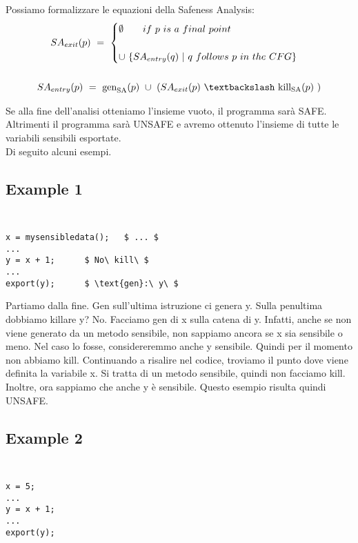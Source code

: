 \documentclass[letterpaper,twocolumn,10pt]{article}
\begin{document}
Possiamo formalizzare le equazioni della Safeness Analysis:
\begin{gather*}
SA_\textrm{$exit$}(p)\ =\ 
\begin{cases}
\emptyset\qquad if\ p\ is\ a\ final\ point\ \\ \\
\cup\ \lbrace SA_\textrm{$entry$}(q)\ |\ q\ follows\ p\ in\ the\ CFG \rbrace 
\end{cases} \\ \\
SA_\textrm{$entry$}(p)\ =\ \text{gen}_\textrm{SA}(p)\ \cup\ (SA_\textrm{$exit$}(p)\ \textbackslash\ \text{kill}_\textrm{SA}(p)\ )
\end{gather*}

Se alla fine dell'analisi otteniamo l'insieme vuoto, il programma sar\`a SAFE. Altrimenti il programma sar\`a UNSAFE e avremo ottenuto l'insieme di tutte le variabili sensibili esportate.\\
Di seguito alcuni esempi.\\

\subsection{Example 1}
{\tt \small
\begin{verbatim}
x = mysensibledata();	$ ... $		
...
y = x + 1;		$ No\ kill\ $
...	
export(y);		$ \text{gen}:\ y\ $
\end{verbatim}
}

Partiamo dalla fine. Gen sull'ultima istruzione ci genera y. Sulla penultima dobbiamo killare y? No. Facciamo gen di x sulla catena di y. Infatti, anche se non viene generato da un metodo sensibile, non sappiamo ancora se x sia sensibile o meno. Nel caso lo fosse, considereremmo anche y sensibile. Quindi per il momento non abbiamo kill. Continuando a risalire nel codice, troviamo il punto dove viene definita la variabile x. Si tratta di un metodo sensibile, quindi non facciamo kill. Inoltre, ora sappiamo che anche y \`e sensibile. Questo esempio risulta quindi UNSAFE.\\

\subsection{Example 2}
{\tt \small
\begin{verbatim}
x = 5;			
...
y = x + 1;	
...	
export(y);		
\end{verbatim}
}
\end{document}
